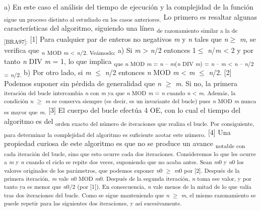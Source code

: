 \documentclass[12pt]{article}
\renewcommand{\_}{\kern-1.5pt\textunderscore\kern-1.5pt}
\begin{document}
\begin{adjustwidth}{0.57in}{0.56in}
{\fontsize{10pt}{12.0pt}\selectfont a) En este caso el análisis del tiempo de ejecución y la complejidad de la función \textsubscript{sigue un proceso distinto al estudiado en los casos anteriores. }Lo primero es resaltar algunas características del algoritmo, siguiendo una línea \textsubscript{de razonamiento similar a la de [BRA97]: }[1] Para cualquier par de enteros no negativos \textit{m }y \textit{n }tales que \textit{n}$ \geq $ \textit{m}, se verifica que \textit{\textsubscript{n }}\textsubscript{MOD \textit{m }< \textit{n}/2. Veámoslo: }a) Si \textit{m }> \textit{n}/2 entonces 1$ \leq $  \textit{n}/\textit{m }< 2 y por tanto \textit{n }DIV \textit{m }= 1, lo que implica \textsubscript{que \textit{n }MOD \textit{m }= \textit{n }– \textit{m}(\textit{n }DIV \textit{m}) = \textit{n }– \textit{m }< \textit{n }– \textit{n}/2 = \textit{n}/2. }b) Por otro lado, si \textit{m }$ \leq $  \textit{n}/2 entonces \textit{n }MOD \textit{m }< \textit{m }$ \leq $  \textit{n}/2. [2] Podemos suponer sin pérdida de generalidad que \textit{n }$ \geq $  \textit{m}. Si no, la primera \textsubscript{iteración del bucle intercambia \textit{n }con \textit{m }ya que \textit{n }MOD \textit{m }= \textit{n }cuando \textit{n }< \textit{m}. Además, la condición \textit{n }$ \geq $  \textit{m }se conserva siempre (es decir, es un invariante del bucle) pues \textit{n }MOD \textit{m }nunca es mayor que \textit{m}. }[3] El cuerpo del bucle efectúa 4 OE, con lo cual el tiempo del algoritmo es del \textsubscript{orden exacto del número de iteraciones que realiza el bucle. Por consiguiente, para determinar la complejidad del algoritmo es suficiente acotar este número. }[4] Una propiedad curiosa de este algoritmo es que no se produce un avance \textsubscript{notable con cada iteración del bucle, sino que esto ocurre cada dos iteraciones. Consideremos lo que les ocurre a \textit{m }y \textit{n }cuando el ciclo se repite dos veces, suponiendo que no acaba antes. Sean \textit{m}0 y \textit{n}0 los valores originales de los parámetros, que podemos suponer \textit{n}0 $ \geq $  \textit{m}0 por [2]. Después de la primera iteración, \textit{m }vale \textit{n}0 MOD \textit{m}0. Después de la segunda iteración, \textit{n }toma ese valor, y por tanto ya es menor que \textit{n}0/2 (por [1]). En consecuencia, \textit{n }vale menos de la mitad de lo que valía tras dos iteraciones del bucle. Como se sigue manteniendo que \textit{n }$ \geq $  \textit{m}, el mismo razonamiento se puede repetir para las siguientes dos iteraciones, y así sucesivamente. }\par}\par

\end{adjustwidth}
\end{document}
